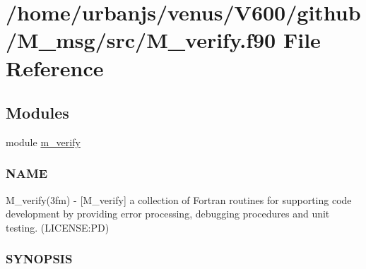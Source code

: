 \hypertarget{M__verify_8f90}{}\section{/home/urbanjs/venus/\+V600/github/\+M\+\_\+msg/src/\+M\+\_\+verify.f90 File Reference}
\label{M__verify_8f90}
\subsection*{Modules}
\begin{DoxyCompactItemize}
\item 
module \mbox{\hyperlink{namespacem__verify}{m\+\_\+verify}}
\begin{DoxyCompactList}\small\item\em \subsubsection*{N\+A\+ME}

M\+\_\+verify(3fm) -\/ \mbox{[}M\+\_\+verify\mbox{]} a collection of Fortran routines for supporting code development by providing error processing, debugging procedures and unit testing. (L\+I\+C\+E\+N\+SE\+:PD) \subsubsection*{S\+Y\+N\+O\+P\+S\+IS}\end{DoxyCompactList}\end{DoxyCompactItemize}
